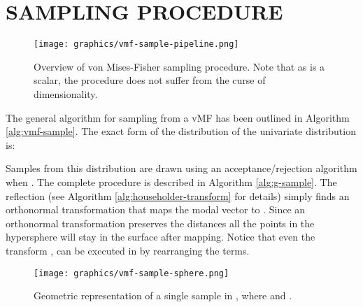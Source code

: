 \documentclass[letterpaper]{article}
\begin{document}

 



\onecolumn

\appendix
\section{SAMPLING PROCEDURE} \label{app:vmf-sample}

\begin{figure}[H]\label{fig:sampling}
  \centering
  \texttt{[image: graphics/vmf-sample-pipeline.png]}
  \caption{Overview of von Mises-Fisher sampling procedure. Note that as  is a scalar, the procedure does not suffer from the curse of dimensionality.}
\end{figure}
 
The general algorithm for sampling from a vMF has been outlined in Algorithm \ref{alg:vmf-sample}. 
The exact form of the distribution of the univariate distribution  is:

Samples from this distribution are drawn using an acceptance/rejection algorithm when . The complete procedure is described in Algorithm \ref{alg:g-sample}. The  reflection (see Algorithm \ref{alg:householder-transform} for details) simply finds an orthonormal transformation that maps the modal vector  to . Since an orthonormal transformation preserves the distances all the points in the hypersphere will stay in the surface after mapping. Notice that even the transform , can be executed in  by rearranging the terms. 

\begin{figure}[H]\label{fig:sphere-sample-example}
  \centering
  \texttt{[image: graphics/vmf-sample-sphere.png]}
  \caption{Geometric representation of a single sample in , where  and .}
\end{figure}
\end{document}
